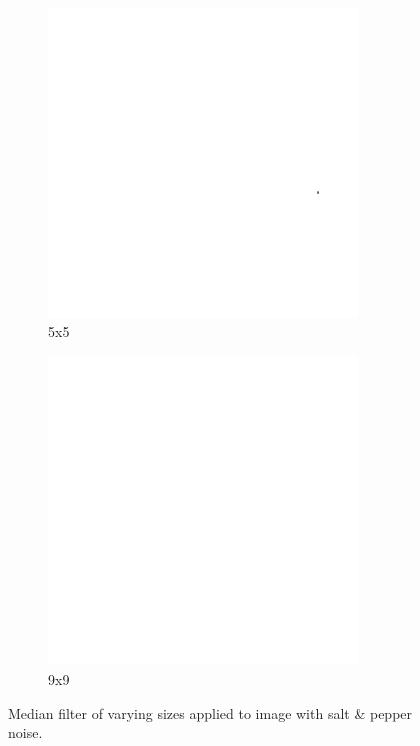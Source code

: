 \begin{figure}[h]
    \begin{subfigure}[b]{0.3\textwidth}
        \includegraphics[width=0.9\textwidth]{../code/2_out/2-2_sp_5x5.png}
        \caption{5x5}
        \label{fig:2-2-1:3}
    \end{subfigure}
    \begin{subfigure}[b]{0.3\textwidth}
        \includegraphics[width=0.9\textwidth]{../code/2_out/2-2_sp_9x9.png}
        \caption{9x9}
        \label{fig:2-2-1:4}
    \end{subfigure}

    \caption{Median filter of varying sizes applied to image with salt \& pepper noise.}
    \label{fig:2-2-1}
\end{figure}


